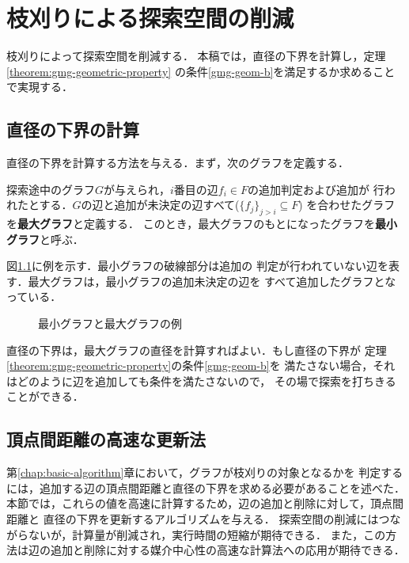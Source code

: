 
\chapter{枝刈りによる探索空間の削減}
\label{chap:reduce-by-prune}
枝刈りによって探索空間を削減する．
本稿では，直径の下界を計算し，定理\ref{theorem:gmg-geometric-property}
の条件\ref{gmg-geom-b}を満足するか求めることで実現する．

\section{直径の下界の計算}
\label{sect:distance-lower-bound}
直径の下界を計算する方法を与える．まず，次のグラフを定義する．
\begin{definition}
  探索途中のグラフ$G$が与えられ，$i$番目の辺$f_i\in F$の追加判定および追加が
  行われたとする．$G$の辺と追加が未決定の辺すべて($\{f_j\}_{j>i}\subseteq F$)
  を合わせたグラフを\textbf{最大グラフ}と定義する．
  このとき，最大グラフのもとになったグラフを\textbf{最小グラフ}と呼ぶ．
\end{definition}
\begin{example}
  図\ref{fig:min-max-graph}に例を示す．最小グラフの破線部分は追加の
  判定が行われていない辺を表す．最大グラフは，最小グラフの追加未決定の辺を
  すべて追加したグラフとなっている．
\end{example}
\begin{figure}
  \centering
  \hfill
  \caption{最小グラフと最大グラフの例}
  \label{fig:min-max-graph}
\end{figure}

直径の下界は，最大グラフの直径を計算すればよい．もし直径の下界が
定理\ref{theorem:gmg-geometric-property}の条件\ref{gmg-geom-b}を
満たさない場合，それはどのように辺を追加しても条件を満たさないので，
その場で探索を打ちきることができる．

\section{頂点間距離の高速な更新法}
\label{sect:faster-min-max}
第\ref{chap:basic-algorithm}章において，グラフが枝刈りの対象となるかを
判定するには，追加する辺の頂点間距離と直径の下界を求める必要があることを述べた．
本節では，これらの値を高速に計算するため，辺の追加と削除に対して，頂点間距離と
直径の下界を更新するアルゴリズムを与える．
探索空間の削減にはつながらないが，計算量が削減され，実行時間の短縮が期待できる．
また，この方法は辺の追加と削除に対する媒介中心性の高速な計算法への応用が期待できる．

